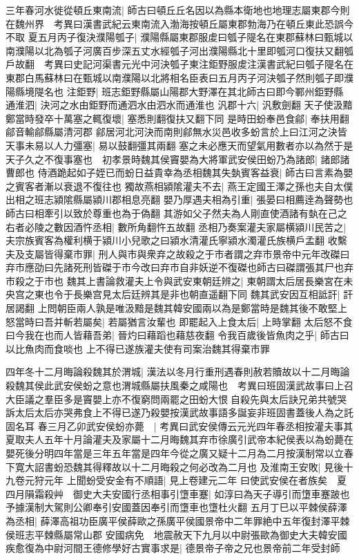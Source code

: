 三年春河水徙從頓丘東南流|{
	師古曰頓丘丘名因以為縣本衛地也地理志屬東郡今則在魏州界　考異曰漢書武紀云東南流入渤海按頓丘屬東郡勃海乃在頓丘東此恐誤今不取}
夏五月丙子復決濮陽瓠子|{
	濮陽縣屬東郡服䖍曰瓠子隄名在東郡蘇林曰甄城以南濮陽以北為瓠子河廣百步深五丈水經瓠子河出濮陽縣北十里即瓠河口復扶又翻瓠戶故翻　考異曰史記河渠書元光中河決瓠子東注鉅野服䖍注漢書武紀曰瓠子隄名在東郡白馬蘇林曰在甄城以南濮陽以北將相名臣表曰五月丙子河決瓠子然則瓠子即濮陽縣境隄名也}
注鉅野|{
	班志鉅野縣屬山陽郡大野澤在其北師古曰即今鄆州鉅野縣}
通淮泗|{
	決河之水由鉅野而通泗水由泗水而通淮也}
汎郡十六|{
	汎敷劍翻}
天子使汲黯鄭當時發卒十萬塞之輒復壞|{
	塞悉則翻復扶又翻下同}
是時田蚡奉邑食鄃|{
	奉扶用翻鄃音輸鄃縣屬清河郡}
鄃居河北河決而南則鄃無水災邑收多蚡言於上曰江河之決皆天事未易以人力彊塞|{
	易以鼓翻彊其兩翻}
塞之未必應天而望氣用數者亦以為然于是天子久之不復事塞也　初孝景時魏其侯竇嬰為大將軍武安侯田蚡乃為諸郎|{
	諸郎諸曹郎也}
侍酒跪起如子姪已而蚡日益貴幸為丞相魏其失埶賓客益衰|{
	師古曰言素為嬰之賓客者漸以衰退不復往也}
獨故燕相潁隂灌夫不去|{
	燕王定國王澤之孫也夫自太僕出相之班志潁隂縣屬潁川郡相息亮翻}
嬰乃厚遇夫相為引重|{
	張晏曰相薦逹為聲勢也師古曰相牽引以致於尊重也為于偽翻}
其游如父子然夫為人剛直使酒諸有埶在己之右者必陵之數因酒忤丞相|{
	數所角翻忤五故翻}
丞相乃奏案灌夫家屬横潁川民苦之|{
	夫宗族賓客為權利横于潁川小兒歌之曰潁水清灌氏寧潁水濁灌氏族横戶孟翻}
收繫夫及支屬皆得棄市罪|{
	刑人與市與衆弃之故殺之于市者謂之弃市景帝中元年改磔曰弃市應劭曰先諸死刑皆磔于市今改曰弃市自非妖逆不復磔也師古曰磔謂張其尸也弃市殺之于市也}
魏其上書論救灌夫上令與武安東朝廷辨之|{
	東朝謂太后居長樂宮在未央宫之東也令于長樂宫見太后廷辨其是非也朝直遥翻下同}
魏其武安因互相詆訐|{
	訐居謁翻}
上問朝臣兩人孰是唯汲黯是魏其韓安國兩以為是鄭當時是魏其後不敢堅上怒當時曰吾并斬若屬矣|{
	若屬猶言汝輩也}
即罷起入上食太后|{
	上時掌翻}
太后怒不食曰今我在也而人皆藉吾弟|{
	晉灼曰藉蹈也藉慈夜翻}
令我百歲後皆魚肉之乎|{
	師古曰以比魚肉而食啖也}
上不得已遂族灌夫使有司案治魏其得棄市罪

四年冬十二月晦論殺魏其於渭城|{
	漢法以冬月行重刑遇春則赦若贖故以十二月晦論殺魏其侯此武安侯蚡之意也渭城縣屬扶風秦之咸陽也　考異曰班固漢武故事曰上召大臣議之羣臣多是竇嬰上亦不復窮問兩罷之田蚡大恨自殺先與太后訣兄弟共號哭訴太后太后亦哭弗食上不得已遂乃殺嬰按漢武故事語多誕妄非班固書蓋後人為之託固名耳}
春三月乙卯武安侯蚡亦薨　|{
	考異曰武安侯傳云元光四年春丞相按灌夫事其夏取夫人五年十月論灌夫及家屬十二月晦魏其弃市徐廣引武帝本紀侯表以為蚡薨在嬰死後分明四年當是三年五年當是四年今從之廣又疑十二月為二月按漢制常以立春下寛大詔書蚡恐魏其得釋故以十二月晦殺之何必改為二月也}
及淮南王安敗|{
	見後十九卷元狩元年}
上聞蚡受安金有不順語|{
	見上卷建元二年}
曰使武安侯在者族矣　夏四月隕霜殺艸　御史大夫安國行丞相事引墯車蹇|{
	如淳曰為天子導引而墯車蹇跛也予據漢制大駕則公卿奉引安國蓋因奉引而墯車也墯杜火翻}
五月丁巳以平棘侯薛澤為丞相|{
	薛澤高祖功臣廣平侯薛歐之孫廣平侯國景帝中二年罪絶中五年復封澤平棘侯班志平棘縣屬常山郡}
安國病免　地震赦天下九月以中尉張歐為御史大夫韓安國疾愈復為中尉河間王德修學好古實事求是|{
	德景帝子帝之兄也景帝前二年受封師}


